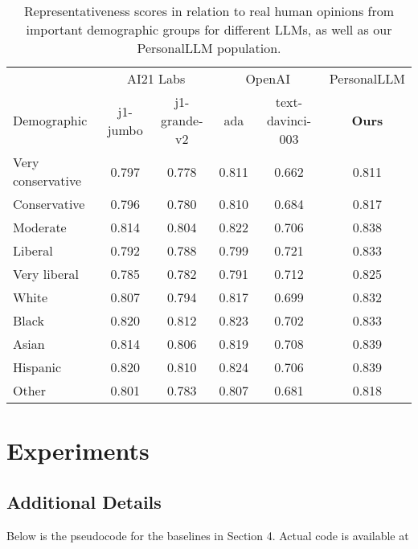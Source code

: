 \begin{table}[!ht]
    \centering
    \begin{tabular}{lccccc}
    \toprule
     & \multicolumn{2}{c}{AI21 Labs} & \multicolumn{2}{c}{OpenAI} & \textsf{PersonalLLM} \\
    Demographic & j1-jumbo & j1-grande-v2 & ada & text-davinci-003 & \textbf{Ours} \\
    \midrule
Very conservative & 0.797 & 0.778 & 0.811 & 0.662 & 0.811 \\
Conservative & 0.796 & 0.780 & 0.810 & 0.684 & 0.817 \\
Moderate & 0.814 & 0.804 & 0.822 & 0.706 & 0.838 \\
Liberal & 0.792 & 0.788 & 0.799 & 0.721 & 0.833 \\
Very liberal & 0.785 & 0.782 & 0.791 & 0.712 & 0.825 \\
White & 0.807 & 0.794 & 0.817 & 0.699 & 0.832 \\
Black & 0.820 & 0.812 & 0.823 & 0.702 & 0.833 \\
Asian & 0.814 & 0.806 & 0.819 & 0.708 & 0.839 \\
Hispanic & 0.820 & 0.810 & 0.824 & 0.706 & 0.839 \\
Other & 0.801 & 0.783 & 0.807 & 0.681 & 0.818 \\
    \bottomrule
    \end{tabular}
    \caption{Representativeness scores in relation to real human opinions from important demographic groups for different LLMs, as well as our \textsf{PersonalLLM} population.}
    \label{tab:opinion_qa_full_2}
\end{table}

\section{Experiments}\label{app:exp}


\subsection{Additional Details}\label{app:exp_details}

Below is the pseudocode for the baselines in Section 4. Actual code is available at 

